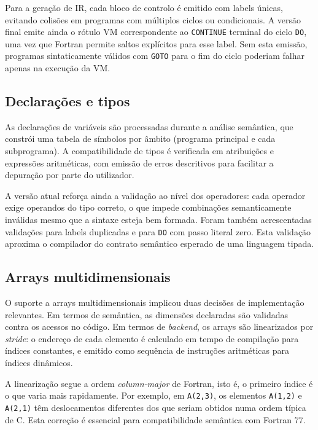 \documentclass{article}
\begin{document}
Para a geração de IR, cada bloco de controlo é emitido com labels únicas, evitando colisões
em programas com múltiplos ciclos ou condicionais. A versão final emite ainda o rótulo VM
correspondente ao \texttt{CONTINUE} terminal do ciclo \texttt{DO}, uma vez que Fortran permite
saltos explícitos para esse label. Sem esta emissão, programas sintaticamente válidos com
\texttt{GOTO} para o fim do ciclo poderiam falhar apenas na execução da VM.

\subsection{Declarações e tipos}

As declarações de variáveis são processadas durante a análise semântica, que constrói uma
tabela de símbolos por âmbito (programa principal e cada subprograma). A compatibilidade de
tipos é verificada em atribuições e expressões aritméticas, com emissão de erros descritivos
para facilitar a depuração por parte do utilizador.

A versão atual reforça ainda a validação ao nível dos operadores: cada operador exige
operandos do tipo correto, o que impede combinações semanticamente inválidas mesmo que a
sintaxe esteja bem formada. Foram também acrescentadas validações para labels duplicadas e
para \texttt{DO} com passo literal zero. Esta validação aproxima o compilador do contrato
semântico esperado de uma linguagem tipada.

\subsection{Arrays multidimensionais}

O suporte a arrays multidimensionais implicou duas decisões de implementação relevantes.
Em termos de semântica, as dimensões declaradas são validadas contra os acessos no código.
Em termos de \textit{backend}, os arrays são linearizados por \textit{stride}: o endereço
de cada elemento é calculado em tempo de compilação para índices constantes, e emitido como
sequência de instruções aritméticas para índices dinâmicos.

A linearização segue a ordem \textit{column-major} de Fortran, isto é, o primeiro índice é o
que varia mais rapidamente. Por exemplo, em \texttt{A(2,3)}, os elementos \texttt{A(1,2)} e
\texttt{A(2,1)} têm deslocamentos diferentes dos que seriam obtidos numa ordem típica de C.
Esta correção é essencial para compatibilidade semântica com Fortran 77.
\end{document}

